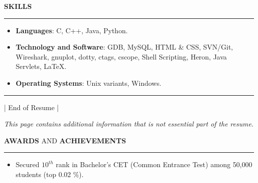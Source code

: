 \documentclass[a4paper, 10pt]{extarticle}
\begin{document}
\begin{large}
\begin{itemize}
\end{itemize}
\vspace{.1cm}
\vspace{-0.2cm}
\begin{flushleft}
{\LARGE{\textbf{S}}\Large{\textbf{KILLS}}}
\end{flushleft}

\vspace{-.1cm} \hrule \vspace{-.1cm}

\begin{itemize}
    \setlength\itemsep{-0.03 cm}
    \item{\textbf{Languages}: C, C++, Java, Python.}
    
    \item{\textbf{Technology and Software}: GDB, MySQL, HTML \& CSS, SVN/Git, Wireshark, gnuplot, dotty, ctags, cscope, Shell Scripting, Heron, Java Servlets, \LaTeX{}.}
    
    \item{\textbf{Operating Systems}: Unix variants, Windows.}
    
\end{itemize} 

\vspace{0.1cm}
\hrule \vspace{-.2cm}
\begin{center}
\tiny{| End of Resume |}
\end{center}


\newpage

\begin{center}
 \large{\textit{This page contains additional information that is not  essential part of the resume.}}
\end{center}
\vspace{.2cm}
\begin{flushleft}
{\LARGE{\textbf{A}}\Large{\textbf{WARDS}} \large{AND} \LARGE{\textbf{A}}\Large{\textbf{CHIEVEMENTS}}}
\end{flushleft}
\vspace{-.2cm} \hrule \vspace{-.1cm}
\begin{itemize}
    \setlength\itemsep{-0.05 cm}
    \item{Secured $10^{th}$ rank in Bachelor's CET (Common Entrance Test) among 50,000 students (top 0.02 \%).}


\end{itemize}
\end{large}
\end{document}
